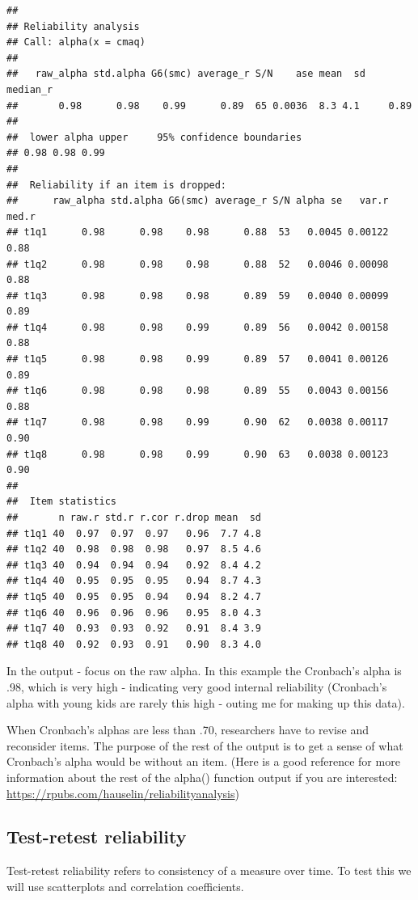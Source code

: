 \documentclass[
]{book}
\begin{document}
\begin{verbatim}
## 
## Reliability analysis   
## Call: alpha(x = cmaq)
## 
##   raw_alpha std.alpha G6(smc) average_r S/N    ase mean  sd median_r
##       0.98      0.98    0.99      0.89  65 0.0036  8.3 4.1     0.89
## 
##  lower alpha upper     95% confidence boundaries
## 0.98 0.98 0.99 
## 
##  Reliability if an item is dropped:
##      raw_alpha std.alpha G6(smc) average_r S/N alpha se   var.r med.r
## t1q1      0.98      0.98    0.98      0.88  53   0.0045 0.00122  0.88
## t1q2      0.98      0.98    0.98      0.88  52   0.0046 0.00098  0.88
## t1q3      0.98      0.98    0.98      0.89  59   0.0040 0.00099  0.89
## t1q4      0.98      0.98    0.99      0.89  56   0.0042 0.00158  0.88
## t1q5      0.98      0.98    0.99      0.89  57   0.0041 0.00126  0.89
## t1q6      0.98      0.98    0.98      0.89  55   0.0043 0.00156  0.88
## t1q7      0.98      0.98    0.99      0.90  62   0.0038 0.00117  0.90
## t1q8      0.98      0.98    0.99      0.90  63   0.0038 0.00123  0.90
## 
##  Item statistics 
##       n raw.r std.r r.cor r.drop mean  sd
## t1q1 40  0.97  0.97  0.97   0.96  7.7 4.8
## t1q2 40  0.98  0.98  0.98   0.97  8.5 4.6
## t1q3 40  0.94  0.94  0.94   0.92  8.4 4.2
## t1q4 40  0.95  0.95  0.95   0.94  8.7 4.3
## t1q5 40  0.95  0.95  0.94   0.94  8.2 4.7
## t1q6 40  0.96  0.96  0.96   0.95  8.0 4.3
## t1q7 40  0.93  0.93  0.92   0.91  8.4 3.9
## t1q8 40  0.92  0.93  0.91   0.90  8.3 4.0
\end{verbatim}

In the output - focus on the raw alpha. In this example the Cronbach's alpha is .98, which is very high - indicating very good internal reliability (Cronbach's alpha with young kids are rarely this high - outing me for making up this data).

When Cronbach's alphas are less than .70, researchers have to revise and reconsider items. The purpose of the rest of the output is to get a sense of what Cronbach's alpha would be without an item. (Here is a good reference for more information about the rest of the alpha() function output if you are interested: \url{https://rpubs.com/hauselin/reliabilityanalysis})

\hypertarget{test-retest-reliability}{%
\subsection{Test-retest reliability}\label{test-retest-reliability}}

Test-retest reliability refers to consistency of a measure over time. To test this we will use scatterplots and correlation coefficients.
\end{document}
